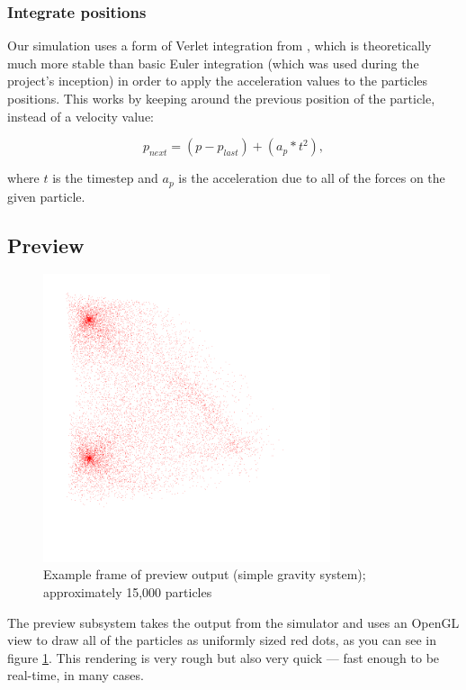 \documentclass{acmsiggraph}
\begin{document}
\subsubsection{Integrate positions}

Our simulation uses a form of Verlet integration from \cite{verlet}, which is theoretically much more stable than basic Euler integration (which was used during the project's inception) in order to apply the acceleration values to the particles positions. This works by keeping around the previous position of the particle, instead of a velocity value:

\begin{equation}
    p_{next}=(p-p_{last}) + (a_p * t^2),
\end{equation}

where $t$ is the timestep and $a_p$ is the acceleration due to all of the forces on the given particle.

\subsection{Preview}

\begin{figure}
    \includegraphics[width=84.5mm]{preview.png}
    \caption{Example frame of preview output (simple gravity system); approximately 15,000 particles}
    \label{fig:preview}
\end{figure}

The preview subsystem takes the output from the simulator and uses an OpenGL view to draw all of the particles as uniformly sized red dots, as you can see in figure \ref{fig:preview}. This rendering is very rough but also very quick --- fast enough to be real-time, in many cases.
\end{document}
